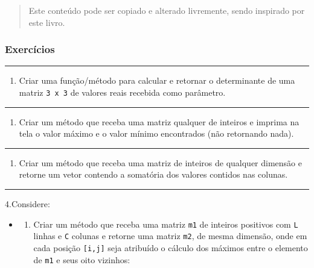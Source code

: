 \documentclass[12pt,a4paper]{article}
\renewcommand{\linethickness}{0.05em}
\providecommand{\tightlist}{%
      \setlength{\itemsep}{0pt}\setlength{\parskip}{0pt}}
\begin{document}
\begin{quote}
Este conteúdo pode ser copiado e alterado livremente, sendo inspirado
por este livro.
\end{quote}

    \hypertarget{exercuxedcios}{%
\subsubsection{Exercícios}\label{exercuxedcios}}

    \begin{center}\rule{0.5\linewidth}{\linethickness}\end{center}

\begin{enumerate}
\def\labelenumi{\arabic{enumi}.}
\tightlist
\item
  Criar uma função/método para calcular e retornar o determinante de uma
  matriz \texttt{3\ x\ 3} de valores reais recebida como parâmetro.
\end{enumerate}

    \begin{center}\rule{0.5\linewidth}{\linethickness}\end{center}

\begin{enumerate}
\def\labelenumi{\arabic{enumi}.}
\setcounter{enumi}{1}
\tightlist
\item
  Criar um método que receba uma matriz qualquer de inteiros e imprima
  na tela o valor máximo e o valor mínimo encontrados (não retornando
  nada).
\end{enumerate}

    \begin{center}\rule{0.5\linewidth}{\linethickness}\end{center}

\begin{enumerate}
\def\labelenumi{\arabic{enumi}.}
\setcounter{enumi}{2}
\tightlist
\item
  Criar um método que receba uma matriz de inteiros de qualquer dimensão
  e retorne um vetor contendo a somatória dos valores contidos nas
  colunas.
\end{enumerate}

    \begin{center}\rule{0.5\linewidth}{\linethickness}\end{center}

4.Considere:

\begin{itemize}
\item
  \begin{enumerate}
  \def\labelenumi{\alph{enumi})}
  \tightlist
  \item
    Criar um método que receba uma matriz \texttt{m1} de inteiros
    positivos com \texttt{L} linhas e \texttt{C} colunas e retorne uma
    matriz \texttt{m2}, de mesma dimensão, onde em cada posição
    \texttt{{[}i,j{]}} seja atribuído o cálculo dos máximos entre o
    elemento de \texttt{m1} e seus oito vizinhos:
  \end{enumerate}
\end{itemize}
\end{document}

